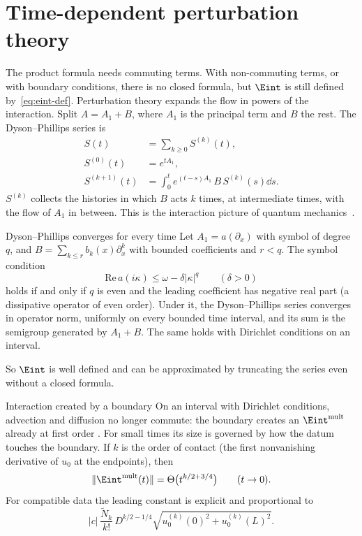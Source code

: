 \section{Time-dependent perturbation theory}

The product formula needs commuting terms. With non-commuting terms, or with boundary conditions, there is no closed formula, but $\Eint$ is still defined by~\eqref{eq:eint-def}. Perturbation theory expands the flow in powers of the interaction. Split $A=A_1+B$, where $A_1$ is the principal term and $B$ the rest. The Dyson--Phillips series is
\begin{equation}\label{eq:dyson}
\begin{aligned}
S(t)&=\sum_{k\ge0}S^{(k)}(t),\\
S^{(0)}(t)&=e^{tA_1},\\
S^{(k+1)}(t)&=\int_0^te^{(t-s)A_1}\,B\,S^{(k)}(s)\dd s .
\end{aligned}
\end{equation}
$S^{(k)}$ collects the histories in which $B$ acts $k$ times, at intermediate times, with the flow of $A_1$ in between. This is the interaction picture of quantum mechanics~\cite{dy}.

\begin{theorem}{Dyson--Phillips converges for every time  \proved}\label{thm:dyson}
Let $A_1=a(\partial_x)$ with symbol of degree $q$, and $B=\sum_{k\le r}b_k(x)\partial_x^k$ with bounded coefficients and $r<q$. The symbol condition
\[
\mathrm{Re}\,a(i\kappa)\le\omega-\delta|\kappa|^q\qquad(\delta>0)
\]
holds if and only if $q$ is even and the leading coefficient has negative real part (a dissipative operator of even order). Under it, the Dyson--Phillips series converges in operator norm, uniformly on every bounded time interval, and its sum is the semigroup generated by $A_1+B$. The same holds with Dirichlet conditions on an interval.

\end{theorem}

So $\Eint$ is well defined and can be approximated by truncating the series even without a closed formula.

\begin{proposition}{Interaction created by a boundary  \proved}\label{prop:boundary}
On an interval with Dirichlet conditions, advection and diffusion no longer commute: the boundary creates an $\Eint^{\mathrm{mult}}$ already at first order . For small times its size is governed by how the datum touches the boundary. If $k$ is the order of contact (the first nonvanishing derivative of $u_0$ at the endpoints), then
\[
\|\Eint^{\mathrm{mult}}(t)\|=\Theta\big(t^{k/2+3/4}\big)\qquad(t\to0).
\]
For compatible data the leading constant is explicit and proportional to
\[
|c|\,\frac{\tilde N_k}{k!}\,D^{k/2-1/4}\sqrt{u_0^{(k)}(0)^2+u_0^{(k)}(L)^2}.
\]
\end{proposition}

